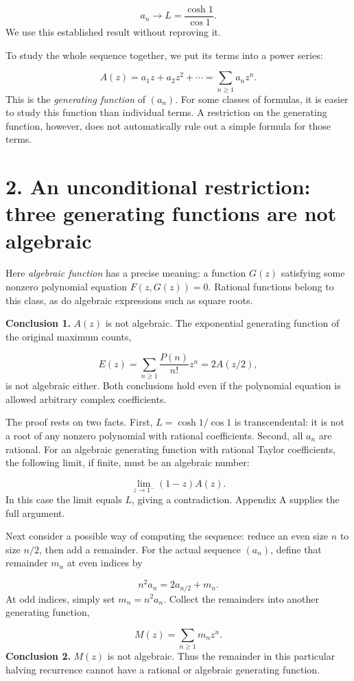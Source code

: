 \documentclass[11pt,a4paper]{article}
\begin{document}
\[
a_n\longrightarrow L=\frac{\cosh1}{\cos1}.
\]
We use this established result without reproving it.

To study the whole sequence together, we put its terms into a power series:

\[
A(z)=a_1z+a_2z^2+\cdots=\sum_{n\ge1}a_nz^n.
\]
This is the \emph{generating function} of $(a_n)$. For some classes of formulas, it is easier to study this function than individual terms. A restriction on the generating function, however, does not automatically rule out a simple formula for those terms.

\section*{2. An unconditional restriction: three generating functions are not algebraic}
Here \emph{algebraic function} has a precise meaning: a function $G(z)$ satisfying some nonzero polynomial equation $F(z,G(z))=0$. Rational functions belong to this class, as do algebraic expressions such as square roots.

\textbf{Conclusion 1.} $A(z)$ is not algebraic. The exponential generating function of the original maximum counts,

\[
E(z)=\sum_{n\ge1}\frac{P(n)}{n!}z^n=2A(z/2),
\]
is not algebraic either. Both conclusions hold even if the polynomial equation is allowed arbitrary complex coefficients.

The proof rests on two facts. First, $L=\cosh1/\cos1$ is transcendental: it is not a root of any nonzero polynomial with rational coefficients. Second, all $a_n$ are rational. For an algebraic generating function with rational Taylor coefficients, the following limit, if finite, must be an algebraic number:

\[
\lim_{z\to1^-}(1-z)A(z).
\]
In this case the limit equals $L$, giving a contradiction. Appendix A supplies the full argument.

Next consider a possible way of computing the sequence: reduce an even size $n$ to size $n/2$, then add a remainder. For the actual sequence $(a_n)$, define that remainder $m_n$ at even indices by

\[
n^2a_n=2a_{n/2}+m_n.
\]
At odd indices, simply set $m_n=n^2a_n$. Collect the remainders into another generating function,

\[
M(z)=\sum_{n\ge1}m_nz^n.
\]
\textbf{Conclusion 2.} $M(z)$ is not algebraic. Thus the remainder in this particular halving recurrence cannot have a rational or algebraic generating function.
\end{document}
